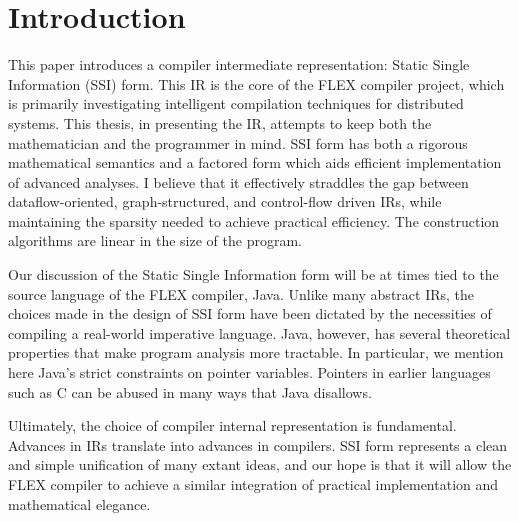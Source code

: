 \documentclass[12pt,titlepage,twoside]{article}
\newcommand{\ignore}[1]{}
\let\oldsection\section
\renewcommand{\section}{\setcounter{figure}{0}\setcounter{table}{0}\oldsection}
\begin{document}
\section{Introduction}
\ignore{
The selection of a compiler internal representation from the many
littering the academic literature may at times seem a black art.  Each
IR is accompanied by papers trumpeting its superiority for one purpose
or another, and each IR feels compelled to introduce new terms and
structures into the jargon.  A pragmatic compiler writer will often
pick randomly from the plethora available, basing the decision on ease
of implementation or understandibility without realizing the extent to
which the IR influences the structure of the compiler.  Similarly, the
theorist will derive proofs based upon intermediate representations
(and languages) that are amenable to mathematical methods, without
regard to current implementation practices.%
\dontfixme{This paragraph will be revised to be less offensive, eventually.}

This paper introduces yet another intermediate representation to the
literature:  
}
This paper introduces a compiler intermediate representation:
Static Single Information (SSI) form.
This IR is the core of the FLEX compiler project, which is primarily
investigating intelligent compilation techniques for distributed
systems.  This thesis, in presenting the IR,
attempts to keep both the mathematician and the programmer in mind.  
SSI form has both a rigorous mathematical semantics and a factored
form which aids efficient implementation of advanced analyses.
I believe that it effectively straddles the gap between dataflow-oriented,
graph-structured, and control-flow driven IRs, while maintaining the
sparsity needed to achieve practical efficiency.  The construction
algorithms are linear in the size of the program.

Our discussion of the Static Single Information form will be at times
tied to the source language of the FLEX compiler, Java.  Unlike many
abstract IRs, the choices made in the design of SSI form have been
dictated by the necessities of compiling a real-world imperative
language.  Java, however, has several theoretical properties that make
program analysis more tractable.  In particular, we
mention here Java's strict constraints on pointer variables.
Pointers in earlier languages such as C can be abused in many ways
that Java disallows.

Ultimately, the choice of compiler internal representation is fundamental.
Advances in IRs translate into advances in compilers.  SSI form
represents a clean and simple unification of many extant ideas, and
our hope is that it will allow the FLEX compiler to achieve a similar
integration of practical implementation and mathematical elegance.
\end{document}
